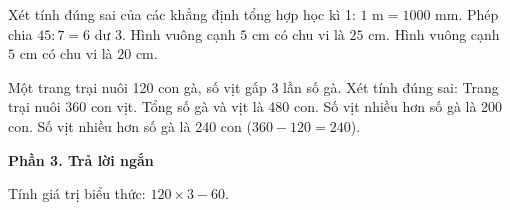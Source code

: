 \begin{ex} %
Xét tính đúng sai của các khẳng định tổng hợp học kì 1:
\choiceTF
{\True $1\text{ m} = 1000\text{ mm}$.}
{\True Phép chia $45 : 7 = 6$ dư $3$.}
{Hình vuông cạnh $5\text{ cm}$ có chu vi là $25\text{ cm}$.}
{\True Hình vuông cạnh $5\text{ cm}$ có chu vi là $20\text{ cm}$.}
\end{ex}

\begin{ex} %
Một trang trại nuôi 120 con gà, số vịt gấp 3 lần số gà. Xét tính đúng sai:
\choiceTF
{\True Trang trại nuôi 360 con vịt.}
{\True Tổng số gà và vịt là 480 con.}
{Số vịt nhiều hơn số gà là 200 con.}
{\True Số vịt nhiều hơn số gà là 240 con ($360 - 120 = 240$).}
\end{ex}

\textbf{Phần 3. Trả lời ngắn}

\begin{ex} %
Tính giá trị biểu thức: $120 \times 3 - 60$.
\end{ex}

